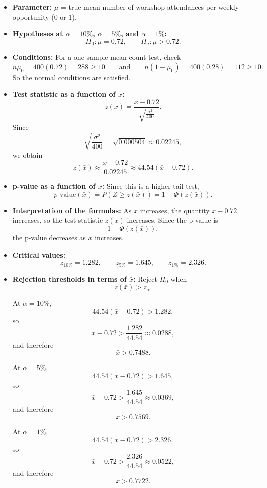 \begin{itemize}
	\item \textbf{Parameter:} \(\mu\) = true mean number of workshop attendances per weekly opportunity (0 or 1).
	
	\item \textbf{Hypotheses at \(\alpha=10\%\), \(\alpha=5\%\), and \(\alpha=1\%\):}
	\[
	H_0\colon \mu=0.72,
	\qquad
	H_a\colon \mu>0.72.
	\]
	
	\item \textbf{Conditions:} For a one-sample mean count test, check
	\[
	n\mu_0=400(0.72)=288\ge10
	\qquad\text{and}\qquad
	n(1-\mu_0)=400(0.28)=112\ge10.
	\]
	So the normal conditions are satisfied.
	
	\item \textbf{Test statistic as a function of \(\bar x\):}
	\[
	z(\bar x)=\frac{\bar x-0.72}{\sqrt{\frac{\sigma^2}{400}}}.
	\]
	Since
	\[
	\sqrt{\frac{\sigma^2}{400}}=\sqrt{0.000504}\approx 0.02245,
	\]
	we obtain
	\[
	z(\bar x)\approx \frac{\bar x-0.72}{0.02245}
	\approx 44.54(\bar x-0.72).
	\]
	
	\item \textbf{p-value as a function of \(\bar x\):} Since this is a higher-tail test,
	\[
	p\text{-value}(\bar x)=P(Z\ge z(\bar x))=1-\Phi(z(\bar x)).
	\]
	
	\item \textbf{Interpretation of the formulas:} As \(\bar x\) increases, the quantity \(\bar x-0.72\) increases, so the test statistic \(z(\bar x)\) increases. Since the p-value is
	\[
	1-\Phi(z(\bar x)),
	\]
	the p-value decreases as \(\bar x\) increases.
	
	\item \textbf{Critical values:}
	\[
	z_{10\%}=1.282,
	\qquad
	z_{5\%}=1.645,
	\qquad
	z_{1\%}=2.326.
	\]
	
	\item \textbf{Rejection thresholds in terms of \(\bar x\):} Reject \(H_0\) when
	\[
	z(\bar x)>z_\alpha.
	\]
	
	At \(\alpha=10\%\),
	\[
	44.54(\bar x-0.72)>1.282,
	\]
	so
	\[
	\bar x-0.72>\frac{1.282}{44.54}\approx 0.0288,
	\]
	and therefore
	\[
	\bar x>0.7488.
	\]
	
	At \(\alpha=5\%\),
	\[
	44.54(\bar x-0.72)>1.645,
	\]
	so
	\[
	\bar x-0.72>\frac{1.645}{44.54}\approx 0.0369,
	\]
	and therefore
	\[
	\bar x>0.7569.
	\]
	
	At \(\alpha=1\%\),
	\[
	44.54(\bar x-0.72)>2.326,
	\]
	so
	\[
	\bar x-0.72>\frac{2.326}{44.54}\approx 0.0522,
	\]
	and therefore
	\[
	\bar x>0.7722.
	\]
	

\end{itemize}
